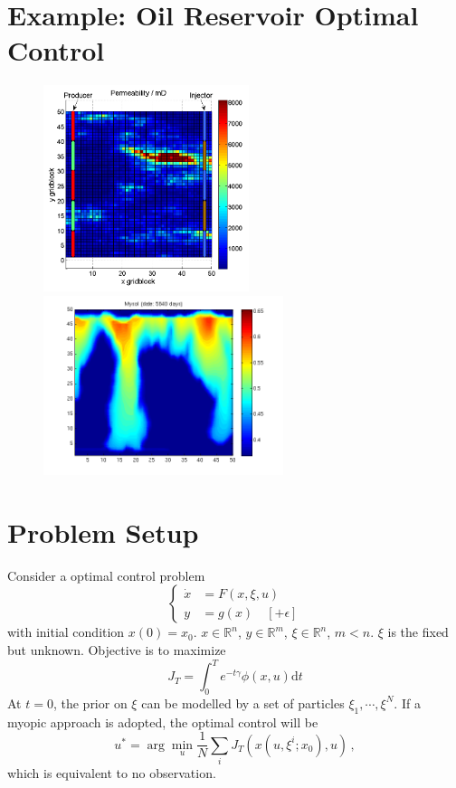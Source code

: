 \documentclass[a4paper,onecolumn]{article}
\begin{document}
\setcounter{page}{1}

\section{Example: Oil Reservoir Optimal Control}
\begin{figure}[h]
\begin{center}
\includegraphics[width=6cm,angle=90]{Permeability.png}
\includegraphics[width=7cm]{mysol_5840.png}
\end{center}
\end{figure}


\section{Problem Setup}
Consider a optimal control problem
\begin{equation}\left\{
\begin{split}
  \dot{x} &= F(x,\xi, u)\\
  y &= g(x) \quad [+\epsilon]
\end{split}
\right.
\end{equation}
with initial condition $x(0) = x_0$. $x\in \mathbb{R}^n$, $y\in
\mathbb{R}^m$, $\xi\in\mathbb{R}^n$, $m<n$. $\xi$ is the fixed but unknown. 
Objective is to maximize
\begin{equation}
    J_T = \int_0^T e^{-t\gamma}\phi(x,u) \textrm{d}t
\end{equation}
At $t=0$, the prior on $\xi$ can be modelled by a set of particles
$\xi_1, \cdots, \xi^N$. 
If a myopic approach is adopted, the optimal control will be
\begin{equation}
    u^* = \arg\min_u \frac{1}{N}\sum_i J_T\left(x(u,\xi^i;x_0), u
	\right)\,,
\end{equation}
which is equivalent to no observation.\\
\end{document}
